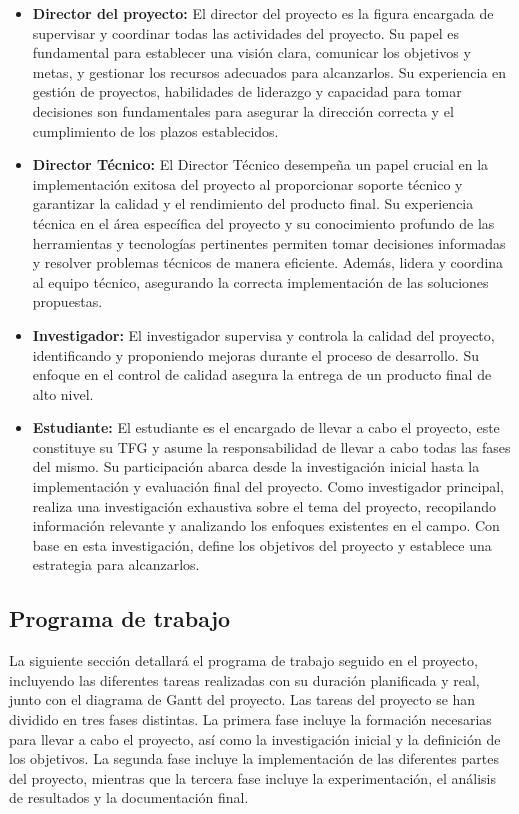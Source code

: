 \begin{itemize}
    \item \textbf{Director del proyecto:} El director del proyecto es la figura
          encargada de supervisar y coordinar todas las actividades del proyecto. Su papel
          es fundamental para establecer una visión clara, comunicar los objetivos y metas,
          y gestionar los recursos adecuados para alcanzarlos. Su experiencia en gestión de
          proyectos, habilidades de liderazgo y capacidad para tomar decisiones son
          fundamentales para asegurar la dirección correcta y el cumplimiento de los plazos
          establecidos.
    \item \textbf{Director Técnico:} El Director Técnico desempeña un papel crucial
          en la implementación exitosa del proyecto al proporcionar soporte técnico y
          garantizar la calidad y el rendimiento del producto final. Su experiencia
          técnica en el área específica del proyecto y su conocimiento profundo de las
          herramientas y tecnologías pertinentes permiten tomar decisiones informadas
          y resolver problemas técnicos de manera eficiente. Además, lidera y coordina al
          equipo técnico, asegurando la correcta implementación de las soluciones propuestas.
    \item \textbf{Investigador:} El investigador supervisa y controla la calidad del
          proyecto, identificando y proponiendo mejoras durante el proceso de desarrollo. Su
          enfoque en el control de calidad asegura la entrega de un producto final de alto nivel.
    \item \textbf{Estudiante:} El estudiante es el encargado de llevar a cabo el proyecto,
          este constituye su TFG y asume la responsabilidad de llevar a cabo todas las fases del
          mismo. Su participación abarca desde la investigación inicial hasta la implementación
          y evaluación final del proyecto. Como investigador principal, realiza una investigación
          exhaustiva sobre el tema del proyecto, recopilando información relevante y analizando
          los enfoques existentes en el campo. Con base en esta investigación, define los objetivos
          del proyecto y establece una estrategia para alcanzarlos.
\end{itemize}

\subsection{Programa de trabajo}
La siguiente sección detallará el programa de trabajo seguido en el proyecto,
incluyendo las diferentes tareas realizadas con su duración planificada y real,
junto con el diagrama de Gantt del proyecto. Las tareas del proyecto se han
dividido en tres fases distintas. La primera fase incluye la formación
necesarias para llevar a cabo el proyecto, así como la investigación inicial y
la definición de los objetivos. La segunda fase incluye la implementación de
las diferentes partes del proyecto, mientras que la tercera fase incluye la
experimentación, el análisis de resultados y la documentación final.

